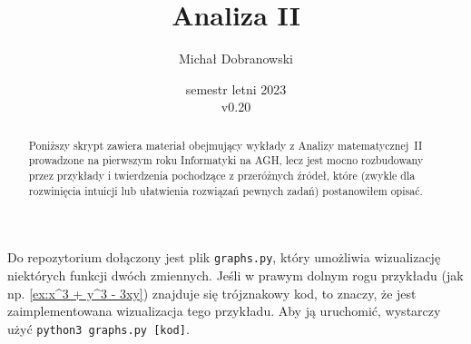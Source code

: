 \documentclass[11pt]{scrartcl}
\title{Analiza II}
\author{Michał Dobranowski}
\date{semestr letni 2023\\ v0.20}
\begin{document}
    \maketitle
    \begin{abstract}
        Poniższy skrypt zawiera materiał obejmujący wykłady z Analizy matematycznej~II prowadzone na pierwszym roku Informatyki na AGH, lecz jest mocno rozbudowany przez przykłady i twierdzenia pochodzące z przeróżnych źródeł, które (zwykle dla rozwinięcia intuicji lub ułatwienia rozwiązań pewnych zadań) postanowiłem opisać.
    \end{abstract}
    \tableofcontents
    \eject







    Do repozytorium dołączony jest plik \texttt{graphs.py}, który umożliwia wizualizację niektórych funkcji dwóch zmiennych. Jeśli w prawym dolnym rogu przykładu (jak np. \ref{ex:x^3 + y^3 - 3xy}) znajduje się trójznakowy kod, to znaczy, że jest zaimplementowana wizualizacja tego przykładu. Aby ją uruchomić, wystarczy użyć \texttt{python3 graphs.py [kod]}.
\end{document}
